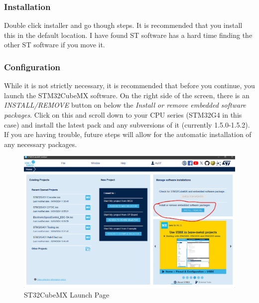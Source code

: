 \documentclass[10pt]{article}
\begin{document}
			\FloatBarrier \subsubsection{Installation}
                Double click installer and go though steps. It is recommended that you install this in the default location. I have found ST software has a hard time finding the other ST software if you move it.
			\FloatBarrier \subsubsection{Configuration}
                While it is not strictly necessary, it is recommended that before you continue, you launch the STM32CubeMX software. On the right side of the screen, there is an \emph{INSTALL/REMOVE} button on below the \emph{Install or remove embedded software packages}. Click on this and scroll down to your CPU series (STM32G4 in this case) and install the latest pack and any subversions of it (currently 1.5.0-1.5.2). If you are having trouble, future steps will allow for the automatic installation of any necessary packages.
                \begin{figure}[H]
                    \centerline{\includegraphics[width=\textwidth]{References/ST32CubeMX.png}}
                    \caption{ST32CubeMX Launch Page}
                \end{figure}
\end{document}

